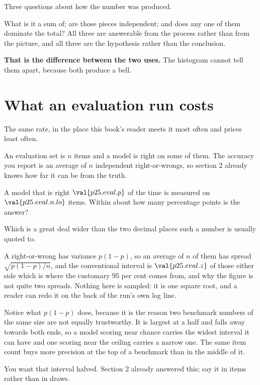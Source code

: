 \begin{fr}
\begin{ansblock}
Three questions about how the number was produced.
\end{ansblock}

What is it a sum of; are those pieces independent; and does any one of them
dominate the total? All three are answerable from the process rather than from
the picture, and all three are the hypothesis rather than the conclusion.

\textbf{That is the difference between the two uses.} The histogram cannot
tell them apart, because both produce a bell.
\end{fr}

\section{What an evaluation run costs}
\label{sec:P25-eval-cost}

\begin{fr}
The same rate, in the place this book's reader meets it most often and prices
least often.

An evaluation set is $n$ items and a model is right on some of them. The
accuracy you report is an average of $n$ independent right-or-wrongs, so
section 2 already knows how far it can be from the truth.

A model that is right $\val{p25.eval.p}$ of the time is measured on
$\val{p25.eval.n.lo}$ items. Within about how many percentage points is the
answer?
\dotline
\nextframe
\end{fr}

\begin{fr}

Which is a great deal wider than the two decimal places such a number is
usually quoted to.

A right-or-wrong has variance $p(1-p)$, so an average of $n$ of them has
spread $\sqrt{p(1-p)/n}$, and the conventional interval is
$\val{p25.eval.z}$ of those either side \dash{} which is where the customary
$95$ per cent comes from, and why the figure is not quite two spreads.
Nothing here is sampled: it is one square root, and a reader can redo it on
the back of the run's own log line.

Notice what $p(1-p)$ does, because it is the reason two benchmark numbers of
the same size are not equally trustworthy. It is largest at a half and falls
away towards both ends, so a model scoring near chance carries the widest
interval it can have and one scoring near the ceiling carries a narrow one.
The same item count buys more precision at the top of a benchmark than in the
middle of it.

You want that interval halved. Section 2 already answered this; say it in
items rather than in draws.
\dotline
\nextframe
\end{fr}


